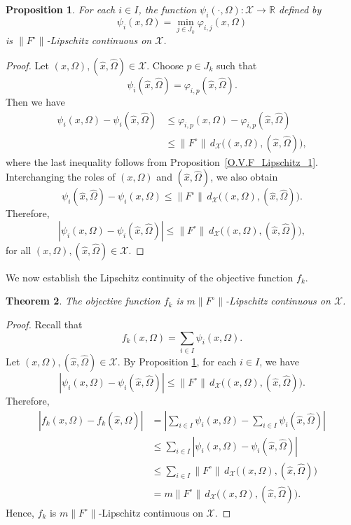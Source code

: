 \documentclass[sn-mathphys-num]{sn-jnl}%
\def\Hat{\widehat}
\newtheorem{theorem}{Theorem}[section]
\newtheorem{proposition}[theorem]{Proposition}
\theoremstyle{definition}
\begin{document}
\begin{proposition}
	\label{O.V.F_Lipschitz_2}
	For each $i \in I$, the function $\psi_i(\cdot,\Omega):\mathcal{X}\to\mathbb{R}$ defined by
	\[
	\psi_i(x,\Omega)=\min_{j \in J_k}\varphi_{i,j}(x,\Omega)
	\]
	is $\|F^\circ\|$-Lipschitz continuous on $\mathcal{X}$.
\end{proposition}


\begin{proof}
	Let $(x,\Omega),(\Hat{x},\Hat{\Omega}) \in \mathcal{X}$. 
	Choose $p \in J_k$ such that
	\[
	\psi_i(\Hat{x},\Hat{\Omega})
	=\varphi_{i,p}(\Hat{x},\Hat{\Omega}).
	\]
	Then we have
	\[
	\begin{aligned}
		\psi_i(x,\Omega)-\psi_i(\Hat{x},\Hat{\Omega})
		&\leq \varphi_{i,p}(x,\Omega)-\varphi_{i,p}(\Hat{x},\Hat{\Omega})\\
		&\leq \|F^\circ\|\, d_{\mathcal{X}}\big((x,\Omega),(\Hat{x},\Hat{\Omega})\big),
	\end{aligned}
	\]
	where the last inequality follows from Proposition~\ref{O.V.F_Lipschitz_1}.
	Interchanging the roles of $(x,\Omega)$ and $(\Hat{x},\Hat{\Omega})$, we also obtain
	\[
	\psi_i(\Hat{x},\Hat{\Omega})-\psi_i(x,\Omega)
	\leq \|F^\circ\|\, d_{\mathcal{X}}\big((x,\Omega),(\Hat{x},\Hat{\Omega})\big).
	\]
	Therefore,
	\[
	|\psi_i(x,\Omega)-\psi_i(\Hat{x},\Hat{\Omega})|
	\leq \|F^\circ\|\, d_{\mathcal{X}}\big((x,\Omega),(\Hat{x},\Hat{\Omega})\big),
	\]
	for all $(x,\Omega),(\Hat{x},\Hat{\Omega}) \in \mathcal{X}$.
\end{proof}

We now establish the Lipschitz continuity of the objective function $f_k$.

\begin{theorem}
	\label{O.V.F_Lipschitz_3}
	The objective function $f_k$ is $m\|F^\circ\|$-Lipschitz continuous on $\mathcal{X}$.
\end{theorem}

\begin{proof}
	Recall that
	\[
	f_k(x,\Omega)=\sum_{i\in I}\psi_i(x,\Omega).
	\]
	Let $(x,\Omega),(\Hat{x},\Hat{\Omega})\in \mathcal{X}$. By Proposition \ref{O.V.F_Lipschitz_2}, for each $i\in I$, we have
	\[
	\left|\psi_i(x,\Omega)-\psi_i(\Hat{x},\Hat{\Omega})\right|
	\le \|F^\circ\|\, d_{\mathcal X}\big((x,\Omega),(\Hat{x},\Hat{\Omega})\big).
	\]
	Therefore,
	\[
	\begin{aligned}
		\left|f_k(x,\Omega)-f_k(\Hat{x},\Hat{\Omega})\right|
		&= \left|\sum_{i\in I}\psi_i(x,\Omega)-\sum_{i\in I}\psi_i(\Hat{x},\Hat{\Omega})\right| \\
		&\le \sum_{i\in I}\left|\psi_i(x,\Omega)-\psi_i(\Hat{x},\Hat{\Omega})\right| \\
		&\le \sum_{i\in I}\|F^\circ\|\, d_{\mathcal X}\big((x,\Omega),(\Hat{x},\Hat{\Omega})\big) \\
		&= m\|F^\circ\|\, d_{\mathcal X}\big((x,\Omega),(\Hat{x},\Hat{\Omega})\big).
	\end{aligned}
	\]
	Hence, $f_k$ is $m\|F^\circ\|$-Lipschitz continuous on $\mathcal{X}$.
\end{proof}
\end{document}
